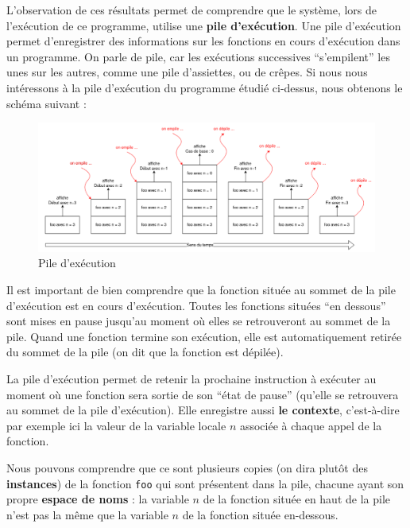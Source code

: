 \documentclass[
  a4paper,
  DIV=11,
  numbers=noendperiod]{scrartcl}
\begin{document}
L'observation de ces résultats permet de comprendre que le système, lors
de l'exécution de ce programme, utilise une \textbf{pile d'exécution}.
Une pile d'exécution permet d'enregistrer des informations sur les
fonctions en cours d'exécution dans un programme. On parle de pile, car
les exécutions successives ``s'empilent'' les unes sur les autres, comme
une pile d'assiettes, ou de crêpes. Si nous nous intéressons à la pile
d'exécution du programme étudié ci-dessus, nous obtenons le schéma
suivant :

\begin{figure}

{\centering \includegraphics{pile_recursive.png}

}

\caption{Pile d'exécution}

\end{figure}

Il est important de bien comprendre que la fonction située au sommet de
la pile d'exécution est en cours d'exécution. Toutes les fonctions
situées ``en dessous'' sont mises en pause jusqu'au moment où elles se
retrouveront au sommet de la pile. Quand une fonction termine son
exécution, elle est automatiquement retirée du sommet de la pile (on dit
que la fonction est dépilée).

La pile d'exécution permet de retenir la prochaine instruction à
exécuter au moment où une fonction sera sortie de son ``état de pause''
(qu'elle se retrouvera au sommet de la pile d'exécution). Elle
enregistre aussi \textbf{le contexte}, c'est-à-dire par exemple ici la
valeur de la variable locale \(n\) associée à chaque appel de la
fonction.

Nous pouvons comprendre que ce sont plusieurs copies (on dira plutôt des
\textbf{instances}) de la fonction \texttt{foo} qui sont présentent dans
la pile, chacune ayant son propre \textbf{espace de noms} : la variable
\(n\) de la fonction située en haut de la pile n'est pas la même que la
variable \(n\) de la fonction située en-dessous.
\end{document}
